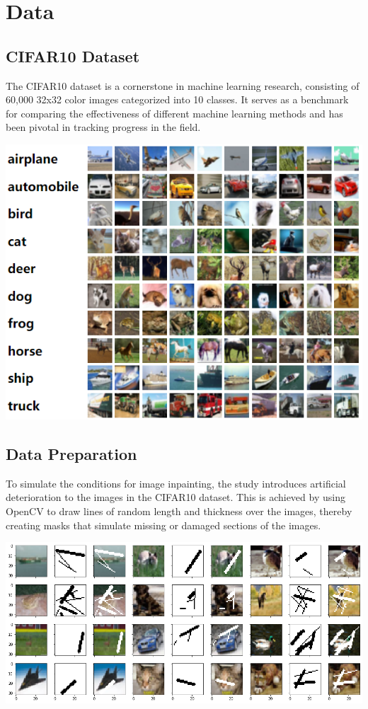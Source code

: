 \documentclass[12pt,a4paper]{article}
\begin{document}
\section{Data}

\subsection{CIFAR10 Dataset}
The CIFAR10 dataset is a cornerstone in machine learning research, consisting of 60,000 32x32 color images categorized into 10 classes. It serves as a benchmark for comparing the effectiveness of different machine learning methods and has been pivotal in tracking progress in the field.

\begin{center}
	\includegraphics[scale=0.5]{cifar10.png}
\end{center}

\subsection{Data Preparation}
To simulate the conditions for image inpainting, the study introduces artificial deterioration to the images in the CIFAR10 dataset. This is achieved by using OpenCV to draw lines of random length and thickness over the images, thereby creating masks that simulate missing or damaged sections of the images.

\begin{center}
	\includegraphics[scale=0.5]{masks.png}
\end{center}
\end{document}

